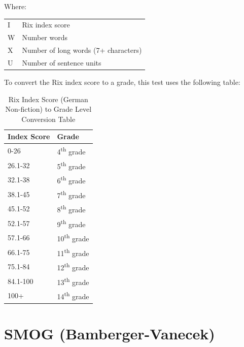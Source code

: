 \documentclass[
]{book}
\theoremstyle{definition}
\theoremstyle{definition}
\theoremstyle{definition}
\theoremstyle{definition}
\theoremstyle{remark}
\begin{document}
Where:

\begin{longtable}[]{@{}
  >{\raggedright\arraybackslash}p{}
  >{\raggedright\arraybackslash}p{}@{}}
\toprule
\endhead
I & Rix index score \\
W & Number words \\
X & Number of long words (7+ characters) \\
U & Number of sentence units \\
\bottomrule
\end{longtable}

\begin{minipage}{\textwidth}

To convert the Rix index score to a grade, this test uses the following table:

\begin{table}

\caption{\label{tab:unnamed-chunk-28}Rix Index Score (German Non-fiction) to Grade Level Conversion Table}
\centering
\begin{tabular}[t]{ll}
\toprule
Index Score & Grade\\
\midrule
0-26 & 4\textsuperscript{th} grade\\
26.1-32 & 5\textsuperscript{th} grade\\
32.1-38 & 6\textsuperscript{th} grade\\
38.1-45 & 7\textsuperscript{th} grade\\
45.1-52 & 8\textsuperscript{th} grade\\
52.1-57 & 9\textsuperscript{th} grade\\
57.1-66 & 10\textsuperscript{th} grade\\
66.1-75 & 11\textsuperscript{th} grade\\
75.1-84 & 12\textsuperscript{th} grade\\
84.1-100 & 13\textsuperscript{th} grade\\
100+ & 14\textsuperscript{th} grade\\
\bottomrule
\end{tabular}
\end{table}

\end{minipage}

\newpage

\hypertarget{smog-bamberger-vanecek}{%
\section{\texorpdfstring{SMOG (Bamberger-Vanecek)}{SMOG (Bamberger-Vanecek)}}\label{smog-bamberger-vanecek}}
\end{document}
